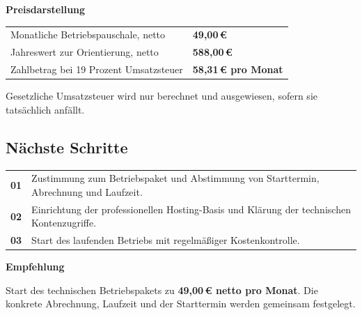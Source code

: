\documentclass[11pt,a4paper]{article}
\newcommand{\eur}[1]{#1\,€}
\begin{document}
\begin{softbox}
  {\sffamily\bfseries\color{NordNavy}Preisdarstellung}

  \begin{tabularx}{\textwidth}{Y R{48mm}}
    Monatliche Betriebspauschale, netto & \sffamily\bfseries\eur{49,00} \\
    Jahreswert zur Orientierung, netto & \sffamily\bfseries\eur{588,00} \\
    Zahlbetrag bei 19 Prozent Umsatzsteuer & \sffamily\bfseries\eur{58,31} pro Monat \\
  \end{tabularx}

  \footnotesize Gesetzliche Umsatzsteuer wird nur berechnet und ausgewiesen, sofern sie tatsächlich anfällt.
\end{softbox}

\subsection{Nächste Schritte}

\begin{tabularx}{\textwidth}{L{12mm}Y}
  \textcolor{NordGold}{\sffamily\Large\bfseries 01} & Zustimmung zum Betriebspaket und Abstimmung von Starttermin, Abrechnung und Laufzeit. \\
  \textcolor{NordGold}{\sffamily\Large\bfseries 02} & Einrichtung der professionellen Hosting-Basis und Klärung der technischen Kontenzugriffe. \\
  \textcolor{NordGold}{\sffamily\Large\bfseries 03} & Start des laufenden Betriebs mit regelmäßiger Kostenkontrolle. \\
\end{tabularx}

\begin{bluebox}
  {\sffamily\large\bfseries\color{NordNavy}Empfehlung}

  Start des technischen Betriebspakets zu \textbf{\eur{49,00} netto pro Monat}. Die konkrete Abrechnung, Laufzeit und der Starttermin werden gemeinsam festgelegt.
\end{bluebox}
\end{document}
